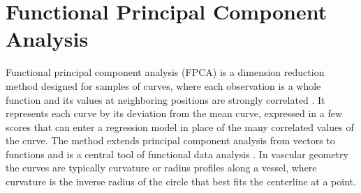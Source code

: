 
\section{Functional Principal Component Analysis}
\label{sec:tech-fpca}

Functional principal component analysis (FPCA) is a dimension reduction method designed for samples of curves, where each observation is a whole function and its values at neighboring positions are strongly correlated \cite{ramsay2005fda, wang2016fda}.
It represents each curve by its deviation from the mean curve, expressed in a few scores that can enter a regression model in place of the many correlated values of the curve.
The method extends principal component analysis from vectors to functions and is a central tool of functional data analysis \cite{ramsay2005fda}.
In vascular geometry the curves are typically curvature or radius profiles along a vessel, where curvature is the inverse radius of the circle that best fits the centerline at a point.

